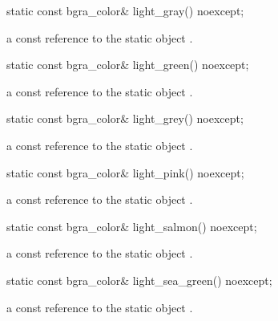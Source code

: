 \begin{itemdecl}
static const bgra_color& light_gray() noexcept;
\end{itemdecl}
\begin{itemdescr}
\pnum
\returns
a const reference to the static  object .
\end{itemdescr}

\begin{itemdecl}
static const bgra_color& light_green() noexcept;
\end{itemdecl}
\begin{itemdescr}
\pnum
\returns
a const reference to the static  object .
\end{itemdescr}

\begin{itemdecl}
static const bgra_color& light_grey() noexcept;
\end{itemdecl}
\begin{itemdescr}
\pnum
\returns
a const reference to the static  object .
\end{itemdescr}

\begin{itemdecl}
static const bgra_color& light_pink() noexcept;
\end{itemdecl}
\begin{itemdescr}
\pnum
\returns
a const reference to the static  object .
\end{itemdescr}

\begin{itemdecl}
static const bgra_color& light_salmon() noexcept;
\end{itemdecl}
\begin{itemdescr}
\pnum
\returns
a const reference to the static  object .
\end{itemdescr}

\begin{itemdecl}
static const bgra_color& light_sea_green() noexcept;
\end{itemdecl}
\begin{itemdescr}
\pnum
\returns
a const reference to the static  object .
\end{itemdescr}

